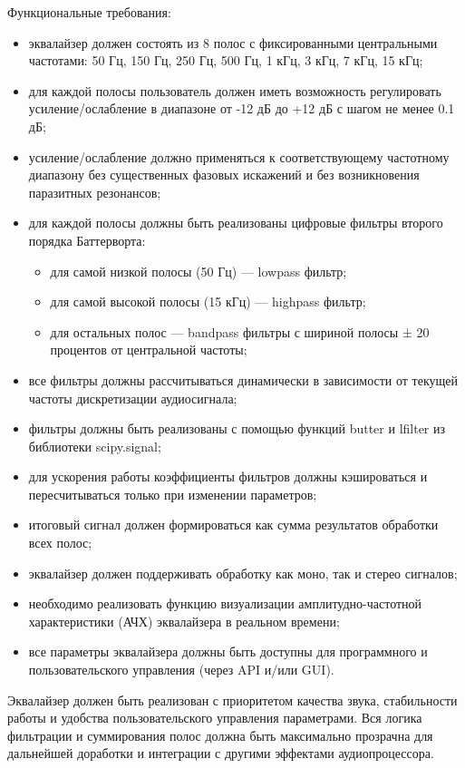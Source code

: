 Функциональные требования:
\begin{itemize}
	\item эквалайзер должен состоять из 8 полос с фиксированными центральными частотами: 50 Гц, 150 Гц, 250 Гц, 500 Гц, 1 кГц, 3 кГц, 7 кГц, 15 кГц;
	\item для каждой полосы пользователь должен иметь возможность регулировать усиление/ослабление в диапазоне от -12 дБ до +12 дБ с шагом не менее 0.1 дБ;
	\item усиление/ослабление должно применяться к соответствующему частотному диапазону без существенных фазовых искажений и без возникновения паразитных резонансов;
	\item для каждой полосы должны быть реализованы цифровые фильтры второго порядка Баттерворта:
	\begin{itemize}
		\item для самой низкой полосы (50 Гц) — lowpass фильтр;
		\item для самой высокой полосы (15 кГц) — highpass фильтр;
		\item для остальных полос — bandpass фильтры с шириной полосы ± 20 процентов от центральной частоты;
	\end{itemize}
	\item все фильтры должны рассчитываться динамически в зависимости от текущей частоты дискретизации аудиосигнала;
	\item фильтры должны быть реализованы с помощью функций butter и lfilter из библиотеки scipy.signal;
	\item для ускорения работы коэффициенты фильтров должны кэшироваться и пересчитываться только при изменении параметров;
	\item итоговый сигнал должен формироваться как сумма результатов обработки всех полос;
	\item эквалайзер должен поддерживать обработку как моно, так и стерео сигналов;
	\item необходимо реализовать функцию визуализации амплитудно-частотной характеристики (АЧХ) эквалайзера в реальном времени;
	\item все параметры эквалайзера должны быть доступны для программного и пользовательского управления (через API и/или GUI).
\end{itemize}

Эквалайзер должен быть реализован с приоритетом качества звука, стабильности работы и удобства пользовательского управления параметрами. Вся логика фильтрации и суммирования полос должна быть максимально прозрачна для дальнейшей доработки и интеграции с другими эффектами аудиопроцессора.

